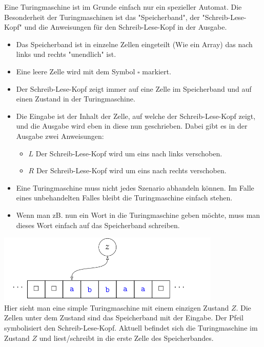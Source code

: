 \documentclass[12pt]{article}
\begin{document}
\begin{flushleft}
    Eine Turingmaschine ist im Grunde einfach nur ein spezieller Automat. Die Besonderheit der Turingmaschinen ist das "Speicherband", der
    "Schreib-Lese-Kopf" und die Anweisungen für den Schreib-Lese-Kopf in der Ausgabe.
    \begin{itemize}
        \item Das Speicherband ist in einzelne Zellen eingeteilt (Wie ein Array) das nach links und rechts "unendlich" ist.
        \item Eine leere Zelle wird mit dem Symbol $\square$ markiert.
        \item Der Schreib-Lese-Kopf zeigt immer auf eine Zelle im Speicherband und auf einen Zustand in der Turingmaschine.
        \item Die Eingabe ist der Inhalt der Zelle, auf welche der Schreib-Lese-Kopf zeigt, und die Ausgabe wird eben in diese nun geschrieben. Dabei gibt es in der Ausgabe zwei Anweisungen:
        \begin{itemize}
            \item $L$ Der Schreib-Lese-Kopf wird um eins nach links verschoben.
            \item $R$ Der Schreib-Lese-Kopf wird um eins nach rechts verschoben.
        \end{itemize}
        \item Eine Turingmaschine muss nicht jedes Szenario abhandeln können. Im Falle eines unbehandelten Falles bleibt die Turingmaschine einfach stehen.
        \item Wenn man zB. nun ein Wort in die Turingmaschine geben möchte, muss man dieses Wort einfach auf das Speicherband schreiben.
    \end{itemize}
    \includegraphics[width=0.8\textwidth]{simple_turing.png} \\
    Hier sieht man eine simple Turingmaschine mit einem einzigen Zustand $Z$. Die Zellen unter dem Zustand sind das Speicherband mit der Eingabe. Der Pfeil symbolisiert den Schreib-Lese-Kopf.
    Aktuell befindet sich die Turingmaschine im Zustand $Z$ und liest/schreibt in die erste Zelle des Speicherbandes.
    \pagebreak
    \linebreak

\end{flushleft}
\end{document}
